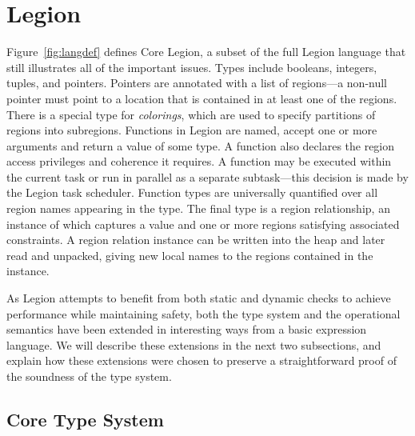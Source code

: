 

\section{Legion}
\label{sec:legioncore}

Figure~\ref{fig:langdef} defines Core Legion, a subset of the full Legion language
that still illustrates all of the important issues.  Types
include booleans, integers, tuples, and pointers.  Pointers
are annotated with a list of regions---a non-null pointer must point to a 
location that is contained in at least one of the regions. There is a special
type for {\em colorings}, which
are used to specify partitions of regions into subregions.
Functions in Legion are named, accept one or more arguments and
return a value of some type.  A function also declares the region
access privileges and coherence it requires.  A function may be executed
within the current task or run in parallel as a separate subtask---this decision is made
by the Legion task scheduler.  Function types are
universally quantified over all region names appearing in the type.
The final type is a region relationship, an instance of which captures a value and
one or more regions satisfying associated constraints.  A region relation instance
can be written into the heap and later read and
unpacked, giving new local names to the regions contained in
the instance.

As Legion attempts to benefit from both static and dynamic checks
to achieve performance while maintaining safety, both the type system and the operational
semantics have been extended in interesting ways from a basic expression language.  We
will describe these extensions in the next two subsections, and explain how these extensions
were chosen to preserve a straightforward proof of the soundness of the type system.

\subsection{Core Type System}
\label{subsec:coretypes}

